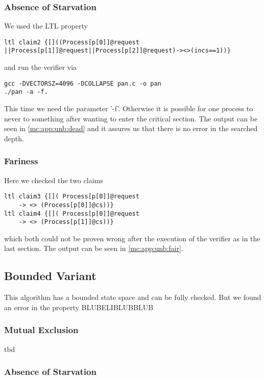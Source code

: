 \documentclass{llncs}
\begin{document}
\subsubsection{Absence of Starvation}

We used the LTL property
\begin{lstlisting}
ltl claim2 {[]((Process[p[0]]@request
||Process[p[1]]@request||Process[p[2]]@request)-><>(incs==1))}
\end{lstlisting}
and run the verifier via
\begin{lstlisting}
gcc -DVECTORSZ=4096 -DCOLLAPSE pan.c -o pan
./pan -a -f.
\end{lstlisting}
This time we need the parameter '-f'. Otherwise it is possible for one process to never to something after wanting to enter
the critical section. The output can be seen in \ref{mc:app:unb:dead} and it assures us that there is no error in
the searched depth.

\subsubsection{Fariness}

Here we checked the two claims

\begin{lstlisting}
ltl claim3 {[]( Process[p[0]]@request 
    -> <> (Process[p[0]]@cs))}
ltl claim4 {[]( Process[p[0]]@request 
    -> <> (Process[p[1]]@cs))}
\end{lstlisting}

which both could not be proven wrong after the execution of the verifier as in the last section.
The output can be seen in \ref{mc:app:unb:fair}.

\subsection{Bounded Variant}

This algorithm has a bounded state space and can be fully checked.
But we found an error in the property BLUBELIBLUBBLUB

\subsubsection{Mutual Exclusion}

tbd

\subsubsection{Absence of Starvation}
\end{document}
